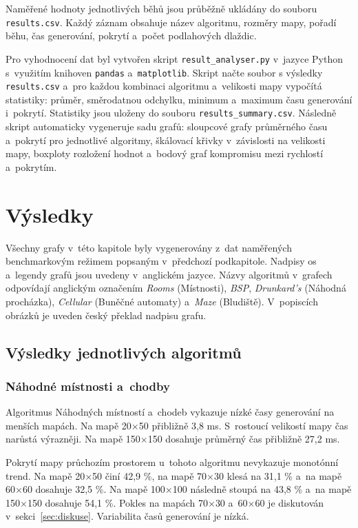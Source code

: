 \documentclass[
   program=itk,
   biblatex,
   figures=true,
   tables=true,
   glossaries,
   index
]{kidiplom}
\begin{document}
Naměřené hodnoty jednotlivých běhů jsou průběžně ukládány do souboru \\ \texttt{results.csv}. Každý záznam obsahuje název algoritmu, rozměry mapy, pořadí běhu, čas generování, pokrytí a~počet podlahových dlaždic.

Pro vyhodnocení dat byl vytvořen skript \texttt{result\_analyser.py} v~jazyce Python s~využitím knihoven \texttt{pandas} a~\texttt{matplotlib}. Skript načte soubor s výsledky \texttt{results.csv} a~pro každou kombinaci algoritmu a~velikosti mapy vypočítá statistiky: průměr, směrodatnou odchylku, minimum a~maximum času generování i~pokrytí. Statistiky jsou uloženy do souboru \texttt{results\_summary.csv}. Následně skript automaticky vygeneruje sadu grafů: sloupcové grafy průměrného času a~pokrytí pro jednotlivé algoritmy, škálovací křivky v~závislosti na velikosti mapy, boxploty rozložení hodnot a~bodový graf kompromisu mezi rychlostí a~pokrytím.

\section{Výsledky}

Všechny grafy v~této kapitole byly vygenerovány z~dat naměřených benchmarkovým režimem popsaným v~předchozí podkapitole. Nadpisy os a~legendy grafů jsou uvedeny v~anglickém jazyce. Názvy algoritmů v~grafech odpovídají anglickým označením \textit{Rooms} (Místnosti), \textit{BSP}, \textit{Drunkard's} (Náhodná procházka), \textit{Cellular} (Buněčné automaty) a~\textit{Maze} (Bludiště). V~popiscích obrázků je uveden český překlad nadpisu grafu.

\subsection{Výsledky jednotlivých algoritmů}

\subsubsection{Náhodné místnosti a~chodby}

Algoritmus Náhodných místností a~chodeb vykazuje nízké časy generování na menších mapách. Na mapě 20$\times$50 přibližně 3,8 ms. S~rostoucí velikostí mapy čas narůstá výrazněji. Na mapě 150$\times$150 dosahuje průměrný čas přibližně 27,2 ms.

Pokrytí mapy průchozím prostorem u~tohoto algoritmu nevykazuje monotónní trend. Na mapě 20$\times$50 činí 42,9 \%, na mapě 70$\times$30 klesá na 31,1 \% a~na mapě 60$\times$60 dosahuje 32,5 \%. Na mapě 100$\times$100 následně stoupá na 43,8 \% a~na mapě 150$\times$150 dosahuje 54,1 \%. Pokles na mapách 70$\times$30 a~60$\times$60 je diskutován v~sekci~\ref{sec:diskuse}. Variabilita časů generování je nízká.
\end{document}
